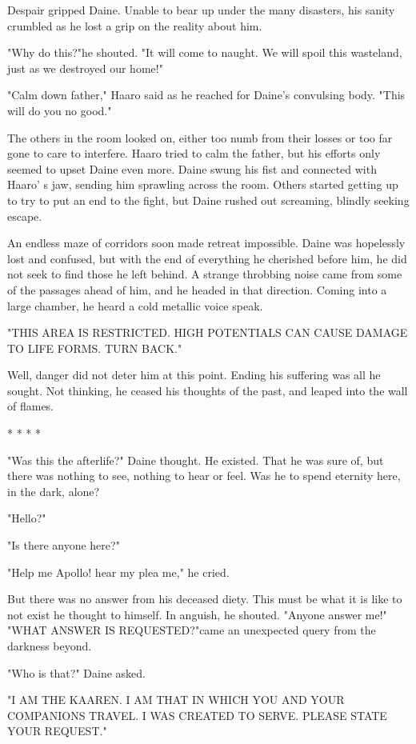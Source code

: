 \begin{multicols*}{2}
Despair gripped Daine. Unable to bear up under the many disasters, his sanity crumbled as he lost a grip on the reality about him.

"Why do this?"he shouted. "It will come to naught. We will spoil this wasteland, just as we destroyed our home!"

"Calm down father," Haaro said as he reached for Daine's convulsing body. "This will do you no good."

The others in the room looked on, either too numb from their losses or too far gone to care to interfere. Haaro tried to calm the father, but his efforts only seemed to upset Daine even more. Daine swung his fist and connected with Haaro' s jaw, sending him sprawling across the room. Others started getting up to try to put an end to the fight, but Daine rushed out screaming, blindly seeking escape.

An endless maze of corridors soon made retreat impossible. Daine was hopelessly lost and confused, but with the end of everything he cherished before him, he did not seek to find those he left behind. A strange throbbing noise came from some of the passages ahead of him, and he headed in that direction. Coming into a large chamber, he heard a cold metallic voice speak.

"THIS AREA IS RESTRICTED. HIGH POTENTIALS CAN CAUSE DAMAGE TO LIFE FORMS. TURN BACK."

Well, danger did not deter him at this point. Ending his suffering was all he sought. Not thinking, he ceased his thoughts of the past, and leaped into the wall of flames.

* * * *

"Was this the afterlife?" Daine thought. He existed. That he was sure of, but there was nothing to see, nothing to
hear or feel. Was he to spend eternity here, in the dark, alone?

"Hello?"

"Is there anyone here?"

"Help me Apollo! hear my plea me," he cried.

But there was no answer from his deceased diety. This must be what it is like to not exist he thought to himself. In anguish, he shouted.
"Anyone answer me!"
"WHAT ANSWER IS REQUESTED?"came an unexpected query from the darkness beyond.

"Who is that?" Daine asked.

"I AM THE KAAREN. I AM THAT IN WHICH YOU AND YOUR COMPANIONS TRAVEL. I WAS CREATED TO SERVE. PLEASE STATE YOUR REQUEST."


\end{multicols*}
